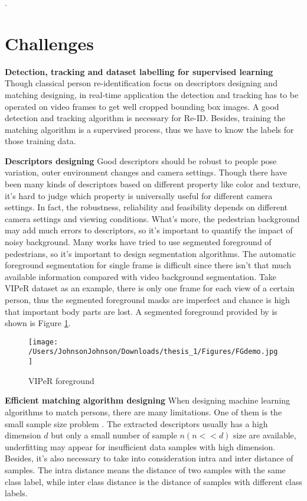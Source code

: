 .

\section{Challenges}

\textbf{Detection, tracking and dataset labelling for supervised learning} Though classical person re-identification focus on descriptors designing and matching designing, in real-time application the detection and tracking has to be operated on video frames to get well cropped bounding box images. A good detection and tracking algorithm is necessary for Re-ID. Besides, training the matching algorithm is a supervised process, thus we have to know the labels for those training data. 

\textbf{Descriptors designing} Good descriptors should be robust to people pose variation, outer environment changes and camera settings. Though there have been many kinds of descriptors based on different property like color and texture, it's hard to judge which property is universally useful for different camera settings. In fact, the robustness, reliability and feasibility depends on different camera settings and viewing conditions. What's more, the pedestrian background may add much errors to descriptors, so it's important to quantify the impact of noisy background. Many works have tried to use segmented foreground of pedestrians, so it's important to design segmentation algorithms. The automatic foreground segmentation for single frame is difficult since there isn't that much available information compared with video background segmentation. Take VIPeR dataset as an example, there is only one frame for each view of a certain person, thus the segmented foreground masks are imperfect and chance is high that important body parts are lost. A segmented foreground provided by \cite{SDALF} is shown is Figure \ref{VIPeRFG}.
\begin{figure}[H]
\centering
\texttt{[image: /Users/JohnsonJohnson/Downloads/thesis\_1/Figures/FGdemo.jpg]}
\vspace{-3em}
\caption{VIPeR foreground}
\label{VIPeRFG}
\end{figure}

\textbf{Efficient matching algorithm designing} 	
When designing machine learning algorithms to match persons, there are many limitations. One of them is the small sample size problem \cite{NFST}. The extracted descriptors usually has a high dimension $d$ but only a small number of sample $n(n<<d)$ size are available, underfitting may appear for insufficient data samples with high dimension. Besides, it's also necessary to take into consideration intra and inter distance of samples.
The intra distance means the distance of two samples with the same class label, while inter class distance is the distance of samples with different class labels. 

